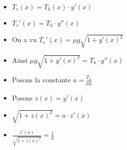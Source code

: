 \begin{frame}

\pause 
\begin{itemize}
\setlength{\itemsep}{6pt}

  
  
  
\end{itemize}
\vspace*{-8ex}
\shorthandoff{:}
\shorthandon{:}


\end{frame}


\begin{frame}

\pause
\begin{itemize}
\setlength{\itemsep}{6pt}
  \item $T_v(x) = T_h(x) \cdot y'(x)$
  \pause
  \item $T_v'(x) = T_h \cdot y''(x)$
  \pause
  \item On a vu $T_v'(x) = \mu g \sqrt{1+ y'(x)^2}$
  \pause
  \item Ainsi   $\mu g \sqrt{1+ y'(x)^2} = T_h \cdot y''(x)$
  \pause
  \item Posons la constante $a =\frac{T_h}{\mu g}$
  \pause
  \item Posons $z(x)= y'(x)$
  \pause
  \item $\sqrt{1+ z(x)^2} = a \cdot z'(x)$
  \pause
  \item $\frac{z'(x)}{\sqrt{1+z(x)^2}} = \frac 1 a$
\end{itemize}

\end{frame}


